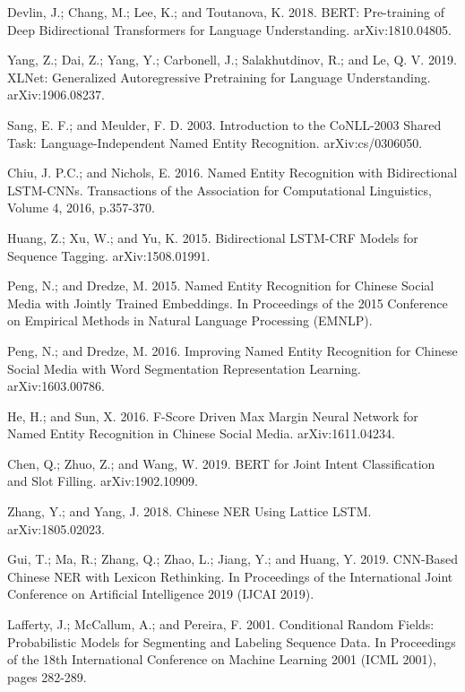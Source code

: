 \documentclass[letterpaper]{article} %
\begin{document}
\smallskip \noindent
Devlin, J.; Chang, M.; Lee, K.; and Toutanova, K. 2018. BERT: Pre-training of Deep Bidirectional Transformers for Language Understanding. arXiv:1810.04805.

\smallskip \noindent
Yang, Z.; Dai, Z.; Yang, Y.; Carbonell, J.; Salakhutdinov, R.; and Le, Q. V. 2019. XLNet: Generalized Autoregressive Pretraining for Language Understanding. arXiv:1906.08237.

\smallskip \noindent
Sang, E. F.; and Meulder, F. D. 2003. Introduction to the CoNLL-2003 Shared Task: Language-Independent Named Entity Recognition. arXiv:cs/0306050. 

\smallskip \noindent
Chiu, J. P.C.; and Nichols, E. 2016. Named Entity Recognition with Bidirectional LSTM-CNNs. Transactions of the Association for Computational Linguistics, Volume 4, 2016, p.357-370. 

\smallskip \noindent
Huang, Z.; Xu, W.; and Yu, K. 2015. Bidirectional LSTM-CRF Models for Sequence Tagging. arXiv:1508.01991. 

\smallskip \noindent
Peng, N.; and Dredze, M. 2015. Named Entity Recognition for Chinese Social Media with Jointly Trained Embeddings. In Proceedings of the 2015 Conference on Empirical Methods in Natural Language Processing (EMNLP). 

\smallskip \noindent
Peng, N.; and Dredze, M. 2016. Improving Named Entity Recognition for Chinese Social Media with Word Segmentation Representation Learning. arXiv:1603.00786. 

\smallskip \noindent
He, H.; and Sun, X. 2016. F-Score Driven Max Margin Neural Network for Named Entity Recognition in Chinese Social Media. 	arXiv:1611.04234. 

\smallskip \noindent
Chen, Q.; Zhuo, Z.; and Wang, W. 2019. BERT for Joint Intent Classification and Slot Filling. arXiv:1902.10909. 

\smallskip \noindent
Zhang, Y.; and Yang, J. 2018. Chinese NER Using Lattice LSTM. arXiv:1805.02023. 

\smallskip \noindent
Gui, T.; Ma, R.; Zhang, Q.; Zhao, L.; Jiang, Y.; and Huang, Y. 2019. CNN-Based Chinese NER with Lexicon Rethinking. In Proceedings of the International Joint Conference on Artificial Intelligence 2019 (IJCAI 2019). 

\smallskip \noindent
Lafferty, J.; McCallum, A.; and Pereira, F. 2001. Conditional Random Fields: Probabilistic Models for Segmenting and Labeling Sequence Data. In Proceedings of the 18th International Conference on Machine Learning 2001 (ICML 2001), pages 282-289.
\end{document}
